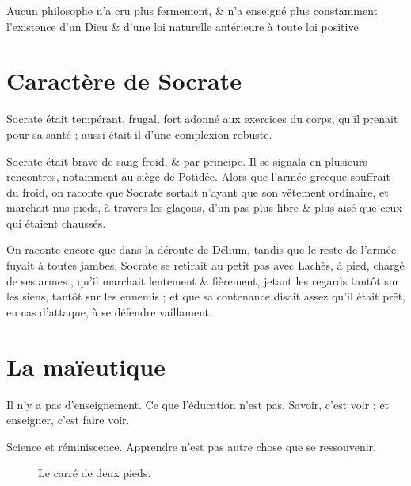 \documentclass[fontsize=28pt,a4paper]{scrartcl}
\begin{document}
Aucun philosophe n'a cru plus fermement, \& n'a enseigné plus constamment l'existence d'un Dieu \& d'une loi naturelle antérieure à toute loi positive.


\clearpage

\section{Caractère de Socrate}

Socrate était tempérant, frugal, fort adonné aux exercices du corps, qu'il prenait pour sa santé ; aussi était-il d'une complexion robuste.

Socrate était brave de sang froid, \& par principe. Il se signala en plusieurs rencontres, notamment au siège de Potidée. Alors que l'armée grecque souffrait du froid, on raconte que Socrate sortait n'ayant que son vêtement ordinaire, et marchait nus pieds, à travers les glaçons, d'un pas plus libre \& plus aisé que ceux qui étaient chaussés.

On raconte encore que dans la déroute de Délium, tandis que le reste de l'armée fuyait à toutes jambes, Socrate se retirait au petit pas avec Lachès, à pied, chargé de ses armes ; qu'il marchait lentement \& fièrement, jetant les regards tantôt sur les siens, tantôt sur les ennemis ; et que sa contenance disait assez qu'il était prêt, en cas d'attaque, à se défendre vaillament.

\clearpage

\section{La maïeutique}

Il n'y a pas d'enseignement. Ce que l'éducation n'est pas. Savoir, c'est voir ; et enseigner, c'est faire voir.

Science et réminiscence. Apprendre n'est pas autre chose que se ressouvenir.

\begin{figure}[h]
  \centering
  \caption{Le carré de deux pieds.}
\end{figure}
\end{document}
